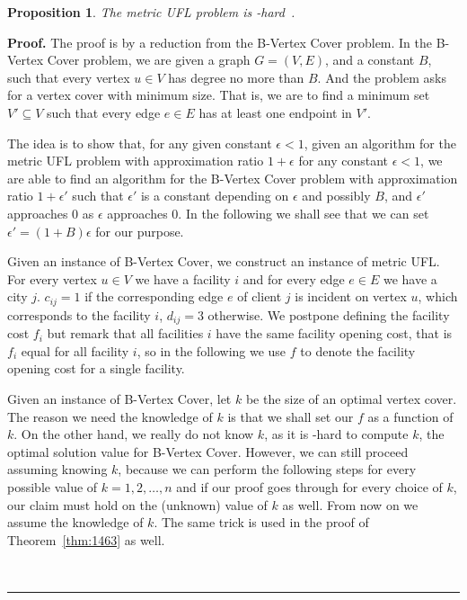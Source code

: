 \documentclass[oneside,final]{ucr}
\newtheorem{proposition}[theorem]{Proposition}
\newenvironment{proof}[1][Proof]{\textbf{#1.} }{\ \rule{0.5em}{0.5em}}
\begin{document}
\begin{proposition}\label{prop:maxsnp}
  The metric UFL problem is {\MaxSNP}-hard~{\mbox{\rm \cite{GuhaK98}}}.
\end{proposition}
\begin{proof}
  The proof is by a reduction from the B-Vertex Cover problem. In the
  B-Vertex Cover problem, we are given a graph $G=(V,E)$, and a
  constant $B$, such that every vertex $u\in V$ has degree no more
  than $B$. And the problem asks for a vertex cover with minimum
  size. That is, we are to find a minimum set $V' \subseteq V$ such
  that every edge $e \in E$ has at least one endpoint in $V'$.

  The idea is to show that, for any given constant $\epsilon < 1$,
  given an algorithm for the metric UFL problem with approximation
  ratio $1+\epsilon$ for any constant $\epsilon < 1$, we are able to
  find an algorithm for the B-Vertex Cover problem with approximation
  ratio $1+\epsilon'$ such that $\epsilon'$ is a constant depending on
  $\epsilon$ and possibly $B$, and $\epsilon'$ approaches $0$ as
  $\epsilon$ approaches $0$. In the following we shall see that we can
  set $\epsilon' = (1+B)\epsilon$ for our purpose.

  Given an instance of B-Vertex Cover, we construct an instance of
  metric UFL. For every vertex $u \in V$ we have a facility $i$ and
  for every edge $e \in E$ we have a city $j$. $c_{ij} = 1$ if the
  corresponding edge $e$ of client $j$ is incident on vertex $u$,
  which corresponds to the facility $i$, $d_{ij} = 3$ otherwise. We
  postpone defining the facility cost $f_i$ but remark that all
  facilities $i$ have the same facility opening cost, that is $f_i$
  equal for all facility $i$, so in the following we use $f$ to denote
  the facility opening cost for a single facility.

  Given an instance of B-Vertex Cover, let $k$ be the size of an
  optimal vertex cover. The reason we need the knowledge of $k$ is
  that we shall set our $f$ as a function of $k$. On the other hand,
  we really do not know $k$, as it is \NP-hard to compute $k$, the
  optimal solution value for B-Vertex Cover. However, we can still
  proceed assuming knowing $k$, because we can perform the following
  steps for every possible value of $k=1,2,\ldots,n$ and if our proof
  goes through for every choice of $k$, our claim must hold on the
  (unknown) value of $k$ as well. From now on we assume the knowledge
  of $k$. The same trick is used in the proof of
  Theorem~\ref{thm:1463} as well.


\end{proof}
\end{document}
